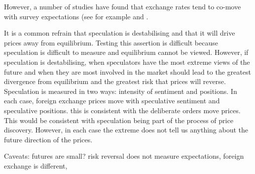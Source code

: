\documentclass[ijfs,article,submit,oneauthor,pdftex,10pt,a4paper]{mdpi}
\begin{document}
  However, a number of studies have found that exchange rates tend to co-move with survey expectations (see for example \citet{FrankelFroot1987} and \citet{Frankel1987Using}. 


 

It is a common refrain that speculation is destabilising and that it will drive prices away from equilibrium.  Testing this assertion is difficult because speculation is difficult to measure and equilibrium cannot be viewed.  However, if speculation is destabilising, when speculators have the most extreme views of the future and when they are most involved in the market should lead to the greatest divergence from equilibrium and the greatest risk that prices will reverse.  Speculation is measured in two ways:  intensity of sentiment and positions.  In each case, foreign exchange prices move with speculative sentiment and speculative positions.  this is consistent with the deliberate orders move prices.  This would be consistent with speculation being part of the process of price discovery.  However, in each case the extreme does not tell us anything about the future direction of the prices. 

Caveats:  futures are small?  risk reversal does not measure expectations, foreign exchange is different,




\end{document}
